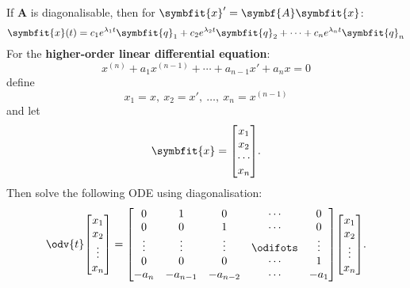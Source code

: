 \documentclass{article}
\begin{document}
\begin{multicols*}{2}
    If \(\symbf{A}\) is diagonalisable, then for \(\symbfit{x}' = \symbf{A} \symbfit{x}\):
    \begin{equation*}
        \symbfit{x}(t) = c_1 e^{\lambda_1 t} \symbfit{q}_1 + c_2 e^{\lambda_2 t} \symbfit{q}_2 + \cdots + c_n e^{\lambda_n t} \symbfit{q}_n
    \end{equation*}
    For the \textbf{higher-order linear differential equation}:
    \begin{equation*}
        x^{\left( n \right)} + a_1 x^{\left( n-1 \right)} + \cdots + a_{n-1} x' + a_n x = 0
    \end{equation*}
    define
    \begin{equation*}
        x_1 = x,\: x_2 = x',\: \dots,\: x_n = x^{\left( n-1 \right)}
    \end{equation*}
    and let
    \begin{equation*}
        \symbfit{x}=\mqty[x_1 \\ x_2 \\ \cdots \\ x_n].
    \end{equation*}
    Then solve the following ODE using diagonalisation:
    \begin{equation*}
        \odv{t}\mqty[
            x_1 \\
            x_2 \\
            \vdotswithin{x_3} \\
            x_n
        ] = \mqty[
        0 & 1 & 0 & \cdots & 0 \\
        0 & 0 & 1 & \cdots & 0 \\
        \vdots & \vdots & \vdots & \odifots & \vdots \\
        0 & 0 & 0 & \cdots & 1 \\
        -a_n & -a_{n-1} & -a_{n-2} & \cdots & -a_1
        ] \mqty[
            x_1 \\
            x_2 \\
            \vdotswithin{x_3} \\
            x_n
        ].
    \end{equation*}

\end{multicols*}
\end{document}
